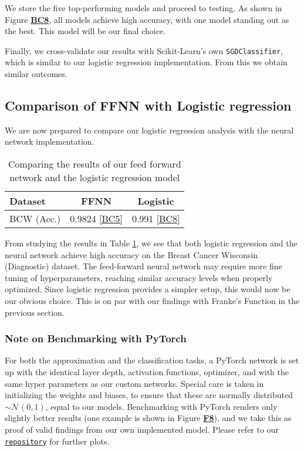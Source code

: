\documentclass{article}
\begin{document}
\begin{multicols}{2}
We store the five top-performing models and proceed to testing. As shown in Figure \hyperref[fig:BC8]{\textbf{BC8}}, all models achieve high accuracy, with one model standing out as the best. This model will be our final choice.

Finally, we cross-validate our results with Scikit-Learn's own \texttt{SGDClassifier}, which is similar to our logistic regression implementation. From this we obtain similar outcomes.

\subsection*{Comparison of FFNN with Logistic regression}
We are now prepared to compare our logistic regression analysis with the neural network implementation. 
\begin{table}[H]
\centering
\begin{tabular}{|l|c|c|}
\hline
\textbf{Dataset} & \textbf{FFNN} & \textbf{Logistic} \\
\hline
BCW (Acc.) & 0.9824 \hyperref[fig:BC5]{[BC5]} & 0.991 \hyperref[fig:BC8]{[BC8]}\\
\hline
\end{tabular}
\caption{Comparing the results of our feed forward network and the logistic regression model}
\label{tab:table2}
\end{table}

From studying the results in Table \ref{tab:table2}, we see that both logistic regression and the neural network achieve high accuracy on the Breast Cancer Wisconsin (Diagnostic) dataset. The feed-forward neural network may require more fine tuning of hyperparameters, reaching similar accuracy levels when properly optimized. Since logistic regression provides a simpler setup, this would now be our obvious choice. This is on par with our findings with Franke's Function in the previous section.

\subsubsection*{Note on Benchmarking with PyTorch}
For both the approximation and the classification tasks, a PyTorch network is set up with the identical layer depth, activation functions, optimizer, and with the same hyper parameters as our custom networks. Special care is taken in initializing the weights and biases, to ensure that these are normally distributed $\sim \mathcal{N}(0, 1)$, equal to our models. Benchmarking with PyTorch renders only slightly better results (one example is shown in Figure \hyperref[fig:F8]{\textbf{F8}}), and we take this as proof of valid findings from our own implemented model. Please refer to our \href{https://github.com/EOH-ML/FYS-STK3155-Projects/tree/main/project2}{\texttt{repository}} for further plots.
\end{multicols}
\end{document}
